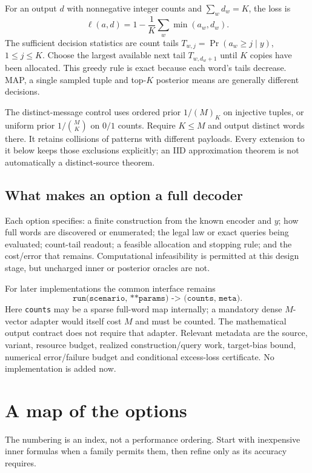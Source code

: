 \documentclass[10pt,a4paper]{article}
\begin{document}
For an output $d$ with nonnegative integer counts and $\sum_wd_w=K$, the loss is
\[
 \ell(a,d)=1-\frac1K\sum_w\min(a_w,d_w).
\]
The sufficient decision statistics are count tails $T_{w,j}=\Pr(a_w\geq j\mid y)$, $1\leq j\leq K$.
Choose the largest available next tail $T_{w,d_w+1}$ until $K$ copies have been allocated.
This greedy rule is exact because each word's tails decrease. MAP, a single sampled tuple and top-$K$
posterior means are generally different decisions.

The distinct-message control uses ordered prior $1/(M)_K$ on injective tuples, or uniform prior
$1/\binom MK$ on $0/1$ counts. Require $K\leq M$ and output distinct words there.
It retains collisions of patterns with different payloads. Every extension to it below keeps those
exclusions explicitly; an IID approximation theorem is not automatically a distinct-source theorem.

\subsection{What makes an option a full decoder}
Each option specifies: a finite construction from the known encoder and $y$; how full words are
discovered or enumerated; the legal law or exact queries being evaluated; count-tail readout; a feasible
allocation and stopping rule; and the cost/error that remains. Computational infeasibility is permitted
at this design stage, but uncharged inner or posterior oracles are not.

For later implementations the common interface remains
\[
 \texttt{run(scenario, **params) -> (counts, meta)}.
\]
Here \texttt{counts} may be a sparse full-word map internally; a mandatory dense $M$-vector adapter
would itself cost $M$ and must be counted. The mathematical output contract does not require that adapter.
Relevant metadata are the source, variant, resource budget, realized construction/query work, target-bias
bound, numerical error/failure budget and conditional excess-loss certificate. No implementation is added now.

\section{A map of the options}
\label{sec:map}
The numbering is an index, not a performance ordering. Start with inexpensive inner formulas when a
family permits them, then refine only as its accuracy requires.
\end{document}
